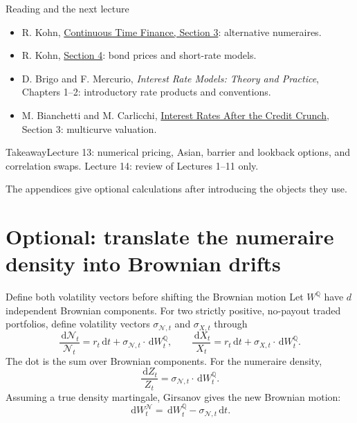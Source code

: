 \documentclass[handout,10pt,t,aspectratio=169]{beamer}
\newenvironment{keybox}{\begin{exampleblock}{Takeaway}}{\end{exampleblock}}
\newcommand{\Q}{\mathbb Q}
\newcommand{\dd}{\,\mathrm d}
\begin{document}
\begin{frame}{Reading and the next lecture}
\small
\begin{itemize}
\item R. Kohn, \href{https://math.nyu.edu/~kohn/cont-time-finance/section3.pdf}
{Continuous Time Finance, Section 3}: alternative numeraires.
\item R. Kohn, \href{https://math.nyu.edu/~kohn/cont-time-finance/section4.pdf}
{Section 4}: bond prices and short-rate models.
\item D. Brigo and F. Mercurio, \emph{Interest Rate Models: Theory and Practice},
Chapters 1--2: introductory rate products and conventions.
\item M. Bianchetti and M. Carlicchi, \href{https://arxiv.org/abs/1103.2567}
{Interest Rates After the Credit Crunch}, Section 3: multicurve valuation.
\end{itemize}
\begin{keybox}Lecture 13: numerical pricing, Asian, barrier and lookback options, and correlation swaps.
Lecture 14: review of Lectures 1--11 only.\end{keybox}
The appendices give optional calculations after introducing the objects they use.
\end{frame}

\appendix
\section{Optional: translate the numeraire density into Brownian drifts}

\begin{frame}{Define both volatility vectors before shifting the Brownian motion}
\small
Let \(W^\Q\) have \(d\) independent Brownian components.
For two strictly positive, no-payout traded portfolios, define volatility vectors
\(\sigma_{\mathcal N,t}\) and \(\sigma_{X,t}\) through
\[
 \frac{\dd\mathcal N_t}{\mathcal N_t}=r_t\dd t+\sigma_{\mathcal N,t}\cdot\dd W_t^\Q,
 \qquad \frac{\dd X_t}{X_t}=r_t\dd t+\sigma_{X,t}\cdot\dd W_t^\Q.
\]
The dot is the sum over Brownian components. For the numeraire density,
\[
 \frac{\dd Z_t}{Z_t}=\sigma_{\mathcal N,t}\cdot\dd W_t^\Q.
\]
Assuming a true density martingale, Girsanov gives the new Brownian motion:
\[
 \boxed{\dd W_t^{\mathcal N}=\dd W_t^\Q-\sigma_{\mathcal N,t}\dd t.}
\]
\end{frame}
\end{document}
